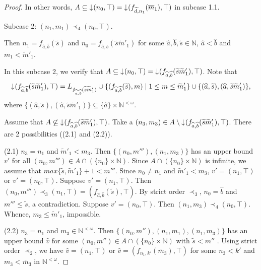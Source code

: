 \documentclass[preprint,12pt]{elsarticle}
\numberwithin{equation}{section}
\newcommand{\dn}{\mathord{\downarrow}\hspace{0.05em}}
\begin{document}
\begin{proof}
In other words, $A\subseteq \dn (n_{0},\top)=\dn (f_{\widetilde{d},n_{1}}(\overline{m}_{1}),\top)$ in subcase 1.1.




Subcase 2: $(n_{1},m_{1})\prec_{4}(n_{0},\top)$.


Then $n_{1}=f_{\widehat{a},\widehat{b}}(\widetilde{s})$ and $n_{0}=f_{\widehat{a},\widehat{b}}(\widetilde{s}\widetilde{m}'_{1})$ for some $\widehat{a},\widehat{b},\widetilde{s}\in \mathbb{N}$, $\widehat{a}<\widehat{b}$ and $m_{1}<\widetilde{m}'_{1}$.

In this subcase 2, we verify that $A\subseteq \dn(n_{0},\top)=\dn (f_{\widehat{a},\widehat{b}}(\widetilde{s}\widetilde{m}'_{1}),\top)$. Note that
$$\dn (f_{\widehat{a},\widehat{b}}(\widetilde{s}\widetilde{m}'_{1}),\top)=L_{f_{\widehat{a},\widehat{b}}(\widetilde{s}\widetilde{m}'_{1})}\cup\{(f_{\widehat{a},\widehat{b}}(\widetilde{s}),m)\mid 1\leq m\leq \widetilde{m}'_{1}\} \cup \{(\widehat{a},\widetilde{s}),(\widehat{a},\widetilde{s}\widetilde{m}'_{1})\},$$ where $\{(\widehat{a},\widetilde{s}),(\widehat{a},\widetilde{s}\widetilde{m}'_{1})\}\subseteq\{\widehat{a}\}\times \mathbb{N}^{<\omega}$.

Assume that $A\not\subseteq\dn (f_{\widehat{a},\widehat{b}}(\widetilde{s}\widetilde{m}'_{1}),\top)$. Take a $(n_{3},m_{3})\in A\setminus\dn (f_{\widehat{a},\widehat{b}}(\widetilde{s}\widetilde{m}'_{1}),\top)$. There are 2 possibilities ((2.1) and (2.2)).



(2.1) $n_{3}=n_{1}$ and $\widetilde{m}'_{1}<m_{3}$. Then $\{(n_{0},m'''),(n_{1},m_{3})\}$ has an upper bound $v'$ for all $(n_{0},m''')\in A\cap (\{n_{0}\}\times \mathbb{N})$. Since $A\cap (\{n_{0}\}\times \mathbb{N})$ is infinite, we assume that $max\{\widetilde{s},\widetilde{m}'_{1}\}+1<m'''$. Since $n_{0}\neq n_{1}$ and $\widetilde{m}'_{1}<m_{3}$, $v'=(n_{1},\top)$ or $v'=(n_{0},\top)$. Suppose $v'=(n_{1},\top)$. Then  $(n_{0},m''')\prec_{3}(n_{1},\top)=(f_{\widehat{a},\widehat{b}}(\widetilde{s}),\top)$. By strict order $\prec_{3}$, $n_{0}=\widehat{b}$ and $m'''\leq \widetilde{s}$, a contradiction. Suppose $v'=(n_{0},\top)$. Then $(n_{1},m_{3})\prec_{4}(n_{0},\top)$. Whence, $m_{3}\leq \widetilde{m}'_{1}$, impossible.

(2.2) $n_{3}=n_{1}$ and $m_{3}\in\mathbb{N}^{<\omega}$. Then $\{(n_{0},m''),(n_{1},m_{1}),(n_{1},m_{3})\}$ has an upper bound $\widehat{v}$ for some $(n_{0},m'')\in A\cap (\{n_{0}\}\times \mathbb{N})$ with $\widetilde{s}<m''$ . Using strict order $\prec_{2}$, we have $\widehat{v}=(n_{1},\top)$ or $\widehat{v}=(f_{n_{1},k'}(\overline{m}_{3}),\top)$ for some $n_{3}< k'$ and $m_{3}<\overline{m}_{3}$ in $\mathbb{N}^{<\omega}$.


\end{proof}
\end{document}
